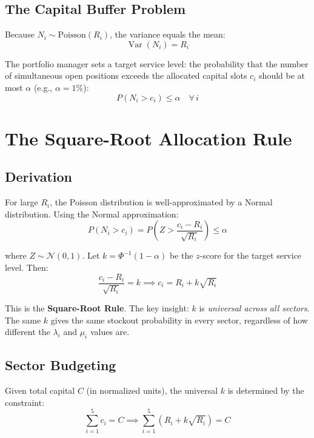 \documentclass[11pt, oneside]{book}
\DeclareMathOperator{\Var}{Var}
\begin{document}
\subsection{The Capital Buffer Problem}

Because $N_i \sim \text{Poisson}(R_i)$, the variance equals the mean:
\begin{equation}
    \Var(N_i) = R_i
\end{equation}

The portfolio manager sets a target service level: the probability that the number of simultaneous open positions exceeds the allocated capital slots $c_i$ should be at most $\alpha$ (e.g., $\alpha = 1\%$):
\begin{equation}
    P(N_i > c_i) \leq \alpha \quad \forall \, i
\end{equation}

\section{The Square-Root Allocation Rule}

\subsection{Derivation}

For large $R_i$, the Poisson distribution is well-approximated by a Normal distribution. Using the Normal approximation:
\begin{equation}
    P(N_i > c_i) = P\!\left(Z > \frac{c_i - R_i}{\sqrt{R_i}}\right) \leq \alpha
\end{equation}

where $Z \sim \mathcal{N}(0,1)$. Let $k = \Phi^{-1}(1 - \alpha)$ be the $z$-score for the target service level. Then:
\begin{equation}
    \frac{c_i - R_i}{\sqrt{R_i}} = k \implies \boxed{c_i = R_i + k\sqrt{R_i}}
\end{equation}

This is the \textbf{Square-Root Rule}. The key insight: $k$ is \textit{universal across all sectors}. The same $k$ gives the same stockout probability in every sector, regardless of how different the $\lambda_i$ and $\mu_i$ values are.

\subsection{Sector Budgeting}

Given total capital $C$ (in normalized units), the universal $k$ is determined by the constraint:
\begin{equation}
    \sum_{i=1}^{5} c_i = C \implies \sum_{i=1}^{5} \left(R_i + k\sqrt{R_i}\right) = C
\end{equation}
\end{document}
